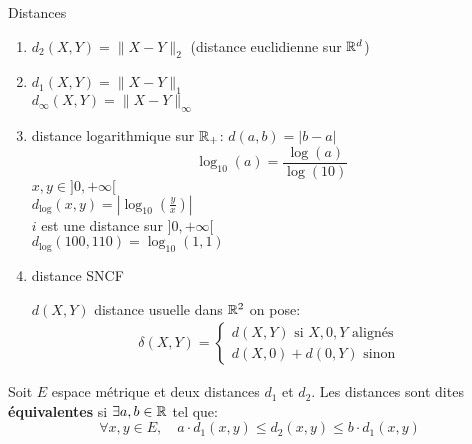 \begin{eg} Distances
   \begin{enumerate}
       \item $d_2(X, Y) = \|X - Y\|_2$ (distance euclidienne sur $\mathbb{R}^d$)
       \item $d_1(X, Y) = \|X - Y\|_1$\\
           $d_{\infty}(X, Y) = \|X - Y\|_{\infty}$
       \item distance logarithmique sur $\mathbb{R}_+$:  $d(a, b) = |b - a|$
           \[
               \log_{10}(a) = \frac{\log(a)}{\log(10)}
           \] 
           $x, y \in ]0, +\infty[$\\ 
           $d_{\log}(x, y) = |\log_{10}(\frac{y}{x})|$ \\
           $i$ est une distance sur  $]0, +\infty[$\\
           $d_{\log}(100, 110) = \log_{10}(1,1)$
       \item distance SNCF
           \begin{center}
               
           \end{center}
           $d(X, Y)$ distance usuelle dans  $\mathbb{R}^2$
           on pose:
            \begin{align*}
               \delta(X, Y) = \begin{cases}
                   d(X, Y) \text{ si } X, 0, Y \text{ alignés}\\
                   d(X, 0) + d(0, Y) \text{ sinon }
               \end{cases}
           \end{align*}
   \end{enumerate}
\end{eg}
\begin{prop}
    Soit $E$ espace métrique et deux distances $d_1$ et $d_2$. Les distances sont dites \textbf{équivalentes} si $\exists a, b \in \mathbb{R}$ tel que:
    \[
    \forall x, y \in E, \quad a\cdot d_1(x, y) \le d_2(x, y) \le b\cdot  d_1(x, y)
    \] 
\end{prop}

